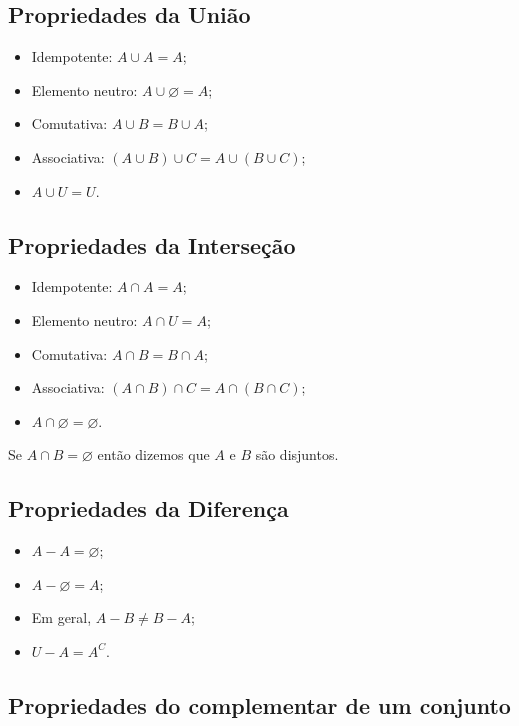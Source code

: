 \subsection{Propriedades da União}

\begin{itemize}
    \item Idempotente: $A\cup A= A$;
    \item Elemento neutro: $A\cup \varnothing = A$;
    \item Comutativa: $A\cup B = B\cup A$;
    \item Associativa: $(A\cup B)\cup C= A\cup (B\cup C)$;
    \item $A\cup U=U$.
\end{itemize}

\subsection{Propriedades da Interseção}

\begin{itemize}
    \item Idempotente: $A\cap A= A$;
    \item Elemento neutro: $A\cap U = A$;
    \item Comutativa: $A\cap B = B\cap A$;
    \item Associativa: $(A\cap B)\cap C= A\cap (B\cap C)$;
    \item $A\cap \varnothing=\varnothing$.
\end{itemize}

\begin{obs}
    Se $A\cap B=\varnothing$ então dizemos que $A$ e $B$ são disjuntos.
\end{obs}

\subsection{Propriedades da Diferença}

\begin{itemize}
    \item $A-A= \varnothing$;
    \item $A-\varnothing = A$;
    \item Em geral, $A- B \neq B - A$;
    \item $U-A = A^C$.
\end{itemize}

\subsection{Propriedades do complementar de um conjunto}

